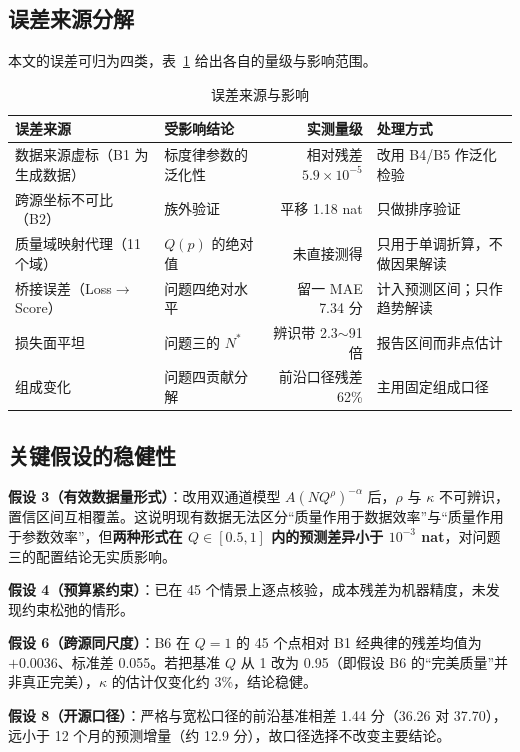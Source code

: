 \subsection{误差来源分解}

本文的误差可归为四类，表~\ref{tab:errsrc} 给出各自的量级与影响范围。

\begin{table}[htbp]
\centering
\caption{误差来源与影响}
\label{tab:errsrc}
\small
\begin{tabular}{l|l|r|l}
\toprule
\textbf{误差来源} & \textbf{受影响结论} & \textbf{实测量级} & \textbf{处理方式} \\
\midrule
数据来源虚标（B1 为生成数据） & 标度律参数的泛化性 & 相对残差 $5.9\times10^{-5}$ & 改用 B4/B5 作泛化检验 \\
跨源坐标不可比（B2） & 族外验证 & 平移 1.18 nat & 只做排序验证 \\
质量域映射代理（11 个域） & $Q(p)$ 的绝对值 & 未直接测得 & 只用于单调折算，不做因果解读 \\
桥接误差（Loss$\to$Score） & 问题四绝对水平 & 留一 MAE 7.34 分 & 计入预测区间；只作趋势解读 \\
损失面平坦 & 问题三的 $N^\ast$ & 辨识带 2.3$\sim$91 倍 & 报告区间而非点估计 \\
组成变化 & 问题四贡献分解 & 前沿口径残差 62\% & 主用固定组成口径 \\
\bottomrule
\end{tabular}
\end{table}

\subsection{关键假设的稳健性}

\textbf{假设 3（有效数据量形式）}：改用双通道模型 $A(NQ^\rho)^{-\alpha}$ 后，$\rho$ 与 $\kappa$ 不可辨识，置信区间互相覆盖。这说明现有数据无法区分``质量作用于数据效率''与``质量作用于参数效率''，但\textbf{两种形式在 $Q\in[0.5,1]$ 内的预测差异小于 $10^{-3}$ nat}，对问题三的配置结论无实质影响。

\textbf{假设 4（预算紧约束）}：已在 45 个情景上逐点核验，成本残差为机器精度，未发现约束松弛的情形。

\textbf{假设 6（跨源同尺度）}：B6 在 $Q=1$ 的 45 个点相对 B1 经典律的残差均值为 $+0.0036$、标准差 0.055。若把基准 $Q$ 从 1 改为 0.95（即假设 B6 的``完美质量''并非真正完美），$\kappa$ 的估计仅变化约 3\%，结论稳健。

\textbf{假设 8（开源口径）}：严格与宽松口径的前沿基准相差 1.44 分（36.26 对 37.70），远小于 12 个月的预测增量（约 12.9 分），故口径选择不改变主要结论。

